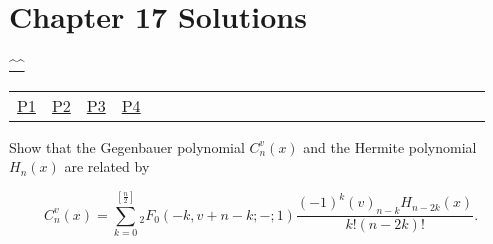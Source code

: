 \section{Chapter 17 Solutions}
\begin{center}\hyperref[toc]{\^{}\^{}}\end{center}
\begin{center}\begin{tabular}{lllllllllllllllllllllllll}
\hyperref[problem1chapter17]{P1} & \hyperref[problem2chapter17]{P2} & \hyperref[problem3chapter17]{P3} & \hyperref[problem4chapter17]{P4}
\end{tabular}\end{center}
\setcounter{problem}{0}
\setcounter{solution}{0}
\begin{problem}\label{problem1chapter17}
Show that the Gegenbauer polynomial $C_n^v(x)$ and the Hermite polynomial $H_n(x)$ are related by

$$C_n^v(x) = \displaystyle\sum_{k=0}^{[\frac{n}{2}]} {}_2F_0(-k,v+n-k;-;1) \dfrac{(-1)^k(v)_{n-k}H_{n-2k}(x)}{k! (n-2k)!}.$$
\end{problem}
